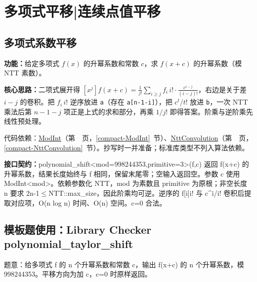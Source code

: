 \clearpage


\Needspace{504pt}

\section{多项式平移|连续点值平移}

\subsection{多项式系数平移}\label{compact-polynomial_shift}

\noindent\textbf{功能：}\allowbreak 给定多项式 $f(x)$ 的升幂系数和常数 $c$，求 $f(x+c)$ 的升幂系数（模 NTT 素数）。

\textbf{核心思路：}\allowbreak 二项式展开得 $[x^j]f(x+c)=\frac{1}{j!}\sum_{i\ge j}f_i\,i!\cdot\frac{c^{i-j}}{(i-j)!}$，右边是关于差 $i-j$ 的卷积。把 $f_i\,i!$ 逆序放进 \texttt{a}（存在 \texttt{a[n-1-i]}），把 $c^t/t!$ 放进 \texttt{b}，一次 NTT 乘法后第 $n-1-j$ 项正是上式的求和部分，再乘 $1/j!$ 即得答案。阶乘与逆阶乘先线性预处理。

代码依赖：\hyperref[compact-ModInt]{ModInt}（第~\pageref{compact-ModInt}~页，\ref{compact-ModInt}~节）、\hyperref[compact-NttConvolution]{NttConvolution}（第~\pageref{compact-NttConvolution}~页，\ref{compact-NttConvolution}~节）。抄写时一并准备；标准库类型不列入算法依赖。

{\sloppy{}\noindent\textbf{接口契约：}polynomial\_shift<mod=998244353,primitive=3>(f,c) 返回 f(x+c) 的升幂系数，结果长度始终与 f 相同，保留末尾零；空输入返回空。参数 c 使用 ModInt<mod>。依赖参数化 NTT，mod 为素数且 primitive 为原根；非空长度 n 要求 2n-1$\le$NTT::max\_size，因此阶乘均可逆。逆序的 f[i]i! 与 c\textasciicircum{}i/i! 卷积后提取对应项，O(n log n) 时间、O(n) 空间。c=0 合法。\par}



\Needspace{329pt}

\subsection*{模板题使用：Library Checker polynomial\_taylor\_shift}

\label{usage-example-30}

题意：给多项式 f 的 n 个升幂系数和常数 c，输出 f(x+c) 的 n 个升幂系数，模 998244353。平移方向为加 c，c=0 时原样返回。

